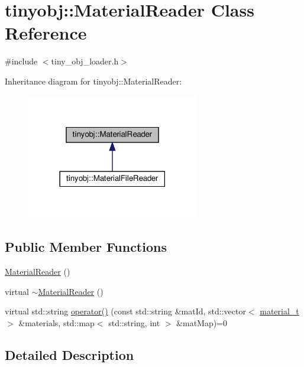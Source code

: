 \hypertarget{classtinyobj_1_1_material_reader}{}\section{tinyobj\+:\+:Material\+Reader Class Reference}
\label{classtinyobj_1_1_material_reader}


{\ttfamily \#include $<$tiny\+\_\+obj\+\_\+loader.\+h$>$}



Inheritance diagram for tinyobj\+:\+:Material\+Reader\+:\nopagebreak
\begin{figure}[H]
\begin{center}
\leavevmode
\includegraphics[width=213pt]{classtinyobj_1_1_material_reader__inherit__graph}
\end{center}
\end{figure}
\subsection*{Public Member Functions}
\begin{DoxyCompactItemize}
\item 
\hyperlink{classtinyobj_1_1_material_reader_a701bdd6217518e0afb5596fcb59925b6}{Material\+Reader} ()
\item 
virtual \hyperlink{classtinyobj_1_1_material_reader_afd62ceccd9b373801226e037ea1a5f9f}{$\sim$\+Material\+Reader} ()
\item 
virtual std\+::string \hyperlink{classtinyobj_1_1_material_reader_afc27ac917abd33dc3ec4a9ae7a519962}{operator()} (const std\+::string \&mat\+Id, std\+::vector$<$ \hyperlink{structtinyobj_1_1material__t}{material\+\_\+t} $>$ \&materials, std\+::map$<$ std\+::string, int $>$ \&mat\+Map)=0
\end{DoxyCompactItemize}


\subsection{Detailed Description}


